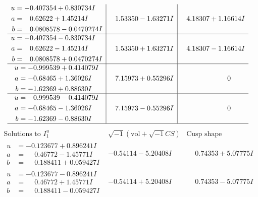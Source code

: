 \documentclass[1p]{elsarticle_modified}
\theoremstyle{definition}
\newcommand{\I}{\sqrt{-1}}
\begin{document}
$$\begin{array}{c|c|c}
\begin{aligned}
u &= -0.407354 + 0.830734 I \\
a &= \phantom{-}0.62622 + 1.45214 I \\
b &= \phantom{-}0.0808578 - 0.0470274 I\end{aligned}
 & \phantom{-}1.53350 - 1.63271 I & \phantom{-}4.18307 + 1.16614 I \\ \hline\begin{aligned}
u &= -0.407354 - 0.830734 I \\
a &= \phantom{-}0.62622 - 1.45214 I \\
b &= \phantom{-}0.0808578 + 0.0470274 I\end{aligned}
 & \phantom{-}1.53350 + 1.63271 I & \phantom{-}4.18307 - 1.16614 I \\ \hline\begin{aligned}
u &= -0.999539 + 0.414079 I \\
a &= -0.68465 + 1.36026 I \\
b &= -1.62369 + 0.88630 I\end{aligned}
 & \phantom{-}7.15973 + 0.55296 I & \phantom{-0.000000 } 0 \\ \hline\begin{aligned}
u &= -0.999539 - 0.414079 I \\
a &= -0.68465 - 1.36026 I \\
b &= -1.62369 - 0.88630 I\end{aligned}
 & \phantom{-}7.15973 - 0.55296 I & \phantom{-0.000000 } 0\\
 \hline 
 \end{array}$$\newpage$$\begin{array}{c|c|c}  
\text{Solutions to }I^u_{1}& \I (\text{vol} + \sqrt{-1}CS) & \text{Cusp shape}\\
 \hline 
\begin{aligned}
u &= -0.123677 + 0.896241 I \\
a &= \phantom{-}0.46772 - 1.45771 I \\
b &= \phantom{-}0.188411 + 0.059427 I\end{aligned}
 & -0.54114 - 5.20408 I & \phantom{-}0.74353 + 5.07775 I \\ \hline\begin{aligned}
u &= -0.123677 - 0.896241 I \\
a &= \phantom{-}0.46772 + 1.45771 I \\
b &= \phantom{-}0.188411 - 0.059427 I\end{aligned}
 & -0.54114 + 5.20408 I & \phantom{-}0.74353 - 5.07775 I \\ \hline\begin{aligned}

\end{aligned}
\end{array}$$
\end{document}
